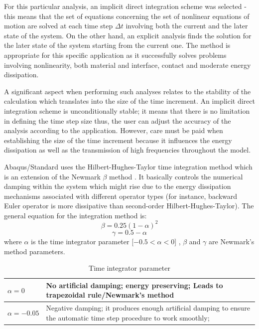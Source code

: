 \documentclass[11pt,a4paper]{report}
\begin{document}
For this particular analysis, an implicit direct integration scheme was selected - this means that the set of equations concerning the set of nonlinear equations of motion are solved at each time step $\Delta t$ involving both the current and the later state of the system. On the other hand, an explicit analysis finds the solution for the later state of the system starting from the current one. The method is appropriate for this specific application as it successfully solves problems involving nonlinearity, both material and interface, contact and moderate energy dissipation. 

A significant aspect when performing such analyses relates to the stability of the calculation which translates into the size of the time increment. An implicit direct integration scheme is unconditionally stable; it means that there is no limitation in defining the time step size thus, the user can adjust the accuracy of the analysis according to the application. However, care must be paid when establishing the size of the time increment because it influences the energy dissipation as well as the transmission of high frequencies throughout the model.

Abaqus/Standard uses the Hilbert-Hughes-Taylor time integration method which is an extension of the Newmark $\beta$ method \cite{newmark1959method}. It basically controls the numerical damping within the system which might rise due to the energy dissipation mechanisms associated with different operator types (for instance, backward Euler operator is more dissipative than second-order Hilbert-Hughes-Taylor). The general equation for the integration method is:
\begin{equation}
	\beta=0.25(1-\alpha)^2
\end{equation}
\begin{equation}
	\gamma= 0.5-\alpha
\end{equation}
where $\alpha$ is the time integrator parameter [$-0.5<\alpha<0$] , $\beta$ and $\gamma$ are Newmark's method parameters.

\begin{table}[h!]
	\centering
	\begin{tabular}{|p{2cm}|p{10cm}|}
		\hline $\alpha=0$       &      No artificial damping; energy preserving;
		Leads to trapezoidal rule/Newmark's method \\
		\hline $\alpha=-0.05$ & Negative damping; it produces enough artificial damping to ensure the automatic time step procedure to work smoothly; \\
		\hline
	\end{tabular}
	\caption{Time integrator parameter}
\end{table}
\end{document}
